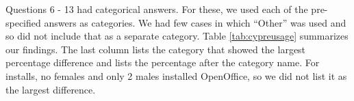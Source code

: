 \begin{table}[ht]
\caption{Comparing male and female participants on questions coded as numbers, Rows show mean
for females, mean for males and p value for T-test.}
\label{tab:cypregender}
\end{table}

Questions 6 - 13 had categorical answers. For these, we used each of the pre-specified answers as categories. We had few cases in which ``Other'' was used and so did not include that as a separate category. Table \ref{tab:cypreusage} summarizes our findings. The last column lists the category that showed the largest percentage difference and lists the percentage after the category name. For installs, no females and only 2 males installed OpenOffice, so we did not list it as the largest difference.

